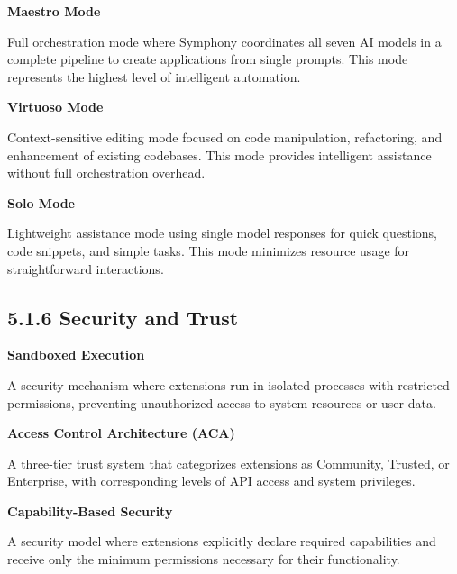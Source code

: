 \vspace{0.3cm}

\noindent\textbf{Maestro Mode}

Full orchestration mode where Symphony coordinates all seven AI models in a complete pipeline to create applications from single prompts. This mode represents the highest level of intelligent automation.

\vspace{0.3cm}

\noindent\textbf{Virtuoso Mode}

Context-sensitive editing mode focused on code manipulation, refactoring, and enhancement of existing codebases. This mode provides intelligent assistance without full orchestration overhead.

\vspace{0.3cm}

\noindent\textbf{Solo Mode}

Lightweight assistance mode using single model responses for quick questions, code snippets, and simple tasks. This mode minimizes resource usage for straightforward interactions.

\subsection*{5.1.6 Security and Trust}

\vspace{0.3cm}

\noindent\textbf{Sandboxed Execution}

A security mechanism where extensions run in isolated processes with restricted permissions, preventing unauthorized access to system resources or user data.

\vspace{0.3cm}

\noindent\textbf{Access Control Architecture (ACA)}

A three-tier trust system that categorizes extensions as Community, Trusted, or Enterprise, with corresponding levels of API access and system privileges.

\vspace{0.3cm}

\noindent\textbf{Capability-Based Security}

A security model where extensions explicitly declare required capabilities and receive only the minimum permissions necessary for their functionality.


